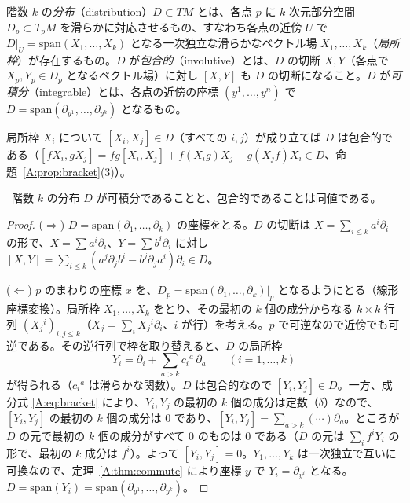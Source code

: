 \begin{defn}
階数 $k$ の\emph{分布}（distribution）$D\subset TM$ とは、各点 $p$ に $k$ 次元部分空間 $D_p\subset T_pM$ を滑らかに対応させるもの、すなわち各点の近傍 $U$ で $D|_U=\mathrm{span}(X_1,\dots,X_k)$ となる一次独立な滑らかなベクトル場 $X_1,\dots,X_k$（\emph{局所枠}）が存在するもの。$D$ が\emph{包合的}（involutive）とは、$D$ の切断 $X,Y$（各点で $X_p,Y_p\in D_p$ となるベクトル場）に対し $[X,Y]$ も $D$ の切断になること。$D$ が\emph{可積分}（integrable）とは、各点の近傍の座標 $(y^1,\dots,y^n)$ で $D=\mathrm{span}(\partial_{y^1},\dots,\partial_{y^k})$ となるもの。
\end{defn}

局所枠 $X_i$ について $[X_i,X_j]\in D$（すべての $i,j$）が成り立てば $D$ は包合的である（$[fX_i,gX_j]=fg[X_i,X_j]+f(X_ig)X_j-g(X_jf)X_i\in D$、命題~\ref{A:prop:bracket}(3)）。

\begin{thm}[Frobenius]\label{A:thm:frobenius}
\tP\ 階数 $k$ の分布 $D$ が可積分であることと、包合的であることは同値である。
\end{thm}
\begin{proof}
($\Rightarrow$) $D=\mathrm{span}(\partial_1,\dots,\partial_k)$ の座標をとる。$D$ の切断は $X=\sum_{i\le k}a^i\partial_i$ の形で、$X=\sum a^i\partial_i$、$Y=\sum b^i\partial_i$ に対し $[X,Y]=\sum_{i\le k}(a^j\partial_jb^i-b^j\partial_ja^i)\partial_i\in D$。

($\Leftarrow$) $p$ のまわりの座標 $x$ を、$D_p=\mathrm{span}(\partial_1,\dots,\partial_k)|_p$ となるようにとる（線形座標変換）。局所枠 $X_1,\dots,X_k$ をとり、その最初の $k$ 個の成分からなる $k\times k$ 行列 $(X_j{}^i)_{i,j\le k}$（$X_j=\sum_iX_j{}^i\partial_i$、$i$ が行）を考える。$p$ で可逆なので近傍でも可逆である。その逆行列で枠を取り替えると、$D$ の局所枠
\[
Y_i=\partial_i+\sum_{a>k}c_i{}^a\,\partial_a\qquad(i=1,\dots,k)
\]
が得られる（$c_i{}^a$ は滑らかな関数）。$D$ は包合的なので $[Y_i,Y_j]\in D$。一方、成分式 \eqref{A:eq:bracket} により、$Y_i,Y_j$ の最初の $k$ 個の成分は定数（$\delta$）なので、$[Y_i,Y_j]$ の最初の $k$ 個の成分は $0$ であり、$[Y_i,Y_j]=\sum_{a>k}(\cdots)\partial_a$。ところが $D$ の元で最初の $k$ 個の成分がすべて $0$ のものは $0$ である（$D$ の元は $\sum_if^iY_i$ の形で、最初の $k$ 成分は $f^i$）。よって $[Y_i,Y_j]=0$。$Y_1,\dots,Y_k$ は一次独立で互いに可換なので、定理~\ref{A:thm:commute} により座標 $y$ で $Y_i=\partial_{y^i}$ となる。$D=\mathrm{span}(Y_i)=\mathrm{span}(\partial_{y^1},\dots,\partial_{y^k})$。
\end{proof}

